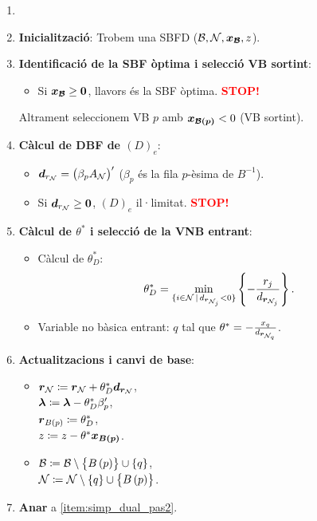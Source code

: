 \begin{alg}\label{alg:ASD}
    \begin{enumerate}
        \item[]
        \item {\bf Inicialització}: Trobem una SBFD ($\mathcal{B}, \mathcal{N}, \boldsymbol{x_{\mathcal{B}}}, z$).
        \item \label{item:simp_dual_pas2} {\bf Identificació de la SBF òptima i selecció VB sortint}:
            \begin{itemize}
                \item Si $\boldsymbol{x_{\mathcal{B}}} \geq \boldsymbol{0}$, llavors és la SBF òptima. \textcolor{red}{\bf STOP!}
            \end{itemize}
            Altrament seleccionem VB $p$ amb $\boldsymbol{x_{\mathcal{B}\left(p\right)}} < 0$ (VB sortint).
        \item {\bf Càlcul de DBF de $\left(D\right)_e$}:
            \begin{itemize}
                \item $\boldsymbol{d}_{r_{\mathcal{N}}} = \left(\beta_p A_{\mathcal{N}}\right)^\prime$ ($\beta_p$ és la fila $p$-èsima de $B^{-1}$).
                \item Si $\boldsymbol{d}_{r_{\mathcal{N}}} \geq \boldsymbol{0}$, $\left(D\right)_e$ il·limitat. \textcolor{red}{\bf STOP!}
            \end{itemize}
        \item {\bf Càlcul de $\theta^*$ i selecció de la VNB entrant}:
            \begin{itemize}
                \item Càlcul de $\theta_D^*$: 
                    \[\theta_D^* = \min_{\{i \in \mathcal{N} \,|\, d_{\boldsymbol{r}_{\mathcal{N}_j}} < 0\}} \left\{-\frac{r_j}{d_{\boldsymbol{r}_{\mathcal{N}_j}}} \right\}.\]
                \item Variable no bàsica entrant: $q$ tal que $\theta^* = -\frac{x_q}{d_{\boldsymbol{r}_{\mathcal{N}_q}}}$.
            \end{itemize}
        \item {\bf Actualitzacions i canvi de base}:
            \begin{itemize}
                \item $\boldsymbol{r}_{\mathcal{N}} \coloneqq \boldsymbol{r}_{\mathcal{N}} + \theta_D^* \boldsymbol{d}_{\boldsymbol{r}_{\mathcal{N}}}$, \\
                    $\boldsymbol{\lambda} \coloneqq \boldsymbol{\lambda} - \theta_D^* \beta_p^\prime$, \\
                    $\boldsymbol{r}_{B\left(p\right)} \coloneqq \theta_D^*$, \\
                    $z \coloneqq z - \theta^* \boldsymbol{x_{B\left(p\right)}}$.
                \item $\mathcal{B} \coloneqq \mathcal{B} \setminus \left\{B\left(p\right)\right\} \cup \left\{q\right\}$, \\
                    $\mathcal{N} \coloneqq \mathcal{N} \setminus \left\{q\right\} \cup \left\{B\left(p\right)\right\}$.
            \end{itemize}
        \item {\bf Anar} a \ref{item:simp_dual_pas2}.
    \end{enumerate}
\end{alg}

